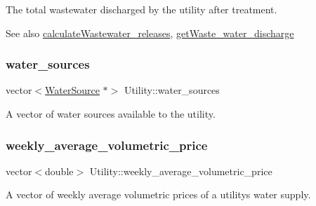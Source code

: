 The total wastewater discharged by the utility after treatment. 

\begin{DoxySeeAlso}{See also}
\mbox{\hyperlink{classUtility_a5feecc73d561de022eb6ba3c657b3dbc}{calculate\+Wastewater\+\_\+releases}}, \mbox{\hyperlink{classUtility_a68dc298c3078ff450cdc7b6a69422da1}{get\+Waste\+\_\+water\+\_\+discharge}} 
\end{DoxySeeAlso}
\mbox{\label{classUtility_a86ff2c92fc7f1b6bdca4bc84fdb535db}} 
\subsubsection{\texorpdfstring{water\+\_\+sources}{water\_sources}}
{\footnotesize\ttfamily vector$<$\mbox{\hyperlink{classWaterSource}{Water\+Source}} $\ast$$>$ Utility\+::water\+\_\+sources\hspace{0.3cm}{\ttfamily [private]}}



A vector of water sources available to the utility. 

\mbox{\label{classUtility_acb779ceddbc1820c8bec7b2f87886d7c}} 
\subsubsection{\texorpdfstring{weekly\+\_\+average\+\_\+volumetric\+\_\+price}{weekly\_average\_volumetric\_price}}
{\footnotesize\ttfamily vector$<$double$>$ Utility\+::weekly\+\_\+average\+\_\+volumetric\+\_\+price\hspace{0.3cm}{\ttfamily [private]}}



A vector of weekly average volumetric prices of a utility\textquotesingle{}s water supply. 

\mbox{\label{classUtility_abcafce1d14d59e9631c07bf49a131b0d}} 
